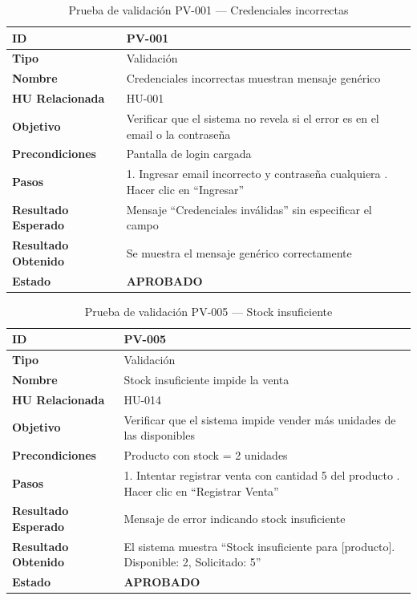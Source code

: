 \documentclass[12pt, letterpaper]{report}
\begin{document}
\begin{table}[H]
\centering
\caption{Prueba de validación PV-001 --- Credenciales incorrectas}
\renewcommand{\arraystretch}{1.3}
\begin{tabularx}{\textwidth}{|l|X|}
\hline
\textbf{ID} & PV-001 \\ \hline
\textbf{Tipo} & Validación \\ \hline
\textbf{Nombre} & Credenciales incorrectas muestran mensaje genérico \\ \hline
\textbf{HU Relacionada} & HU-001 \\ \hline
\textbf{Objetivo} & Verificar que el sistema no revela si el error es en el email o la contraseña \\ \hline
\textbf{Precondiciones} & Pantalla de login cargada \\ \hline
\textbf{Pasos} & 1. Ingresar email incorrecto y contraseña cualquiera \newline 2. Hacer clic en ``Ingresar'' \\ \hline
\textbf{Resultado Esperado} & Mensaje ``Credenciales inválidas'' sin especificar el campo \\ \hline
\textbf{Resultado Obtenido} & Se muestra el mensaje genérico correctamente \\ \hline
\textbf{Estado} & \textbf{APROBADO} \\ \hline
\end{tabularx}
\end{table}

\begin{table}[H]
\centering
\caption{Prueba de validación PV-005 --- Stock insuficiente}
\renewcommand{\arraystretch}{1.3}
\begin{tabularx}{\textwidth}{|l|X|}
\hline
\textbf{ID} & PV-005 \\ \hline
\textbf{Tipo} & Validación \\ \hline
\textbf{Nombre} & Stock insuficiente impide la venta \\ \hline
\textbf{HU Relacionada} & HU-014 \\ \hline
\textbf{Objetivo} & Verificar que el sistema impide vender más unidades de las disponibles \\ \hline
\textbf{Precondiciones} & Producto con stock = 2 unidades \\ \hline
\textbf{Pasos} & 1. Intentar registrar venta con cantidad 5 del producto \newline 2. Hacer clic en ``Registrar Venta'' \\ \hline
\textbf{Resultado Esperado} & Mensaje de error indicando stock insuficiente \\ \hline
\textbf{Resultado Obtenido} & El sistema muestra ``Stock insuficiente para [producto]. Disponible: 2, Solicitado: 5'' \\ \hline
\textbf{Estado} & \textbf{APROBADO} \\ \hline
\end{tabularx}
\end{table}
\end{document}

